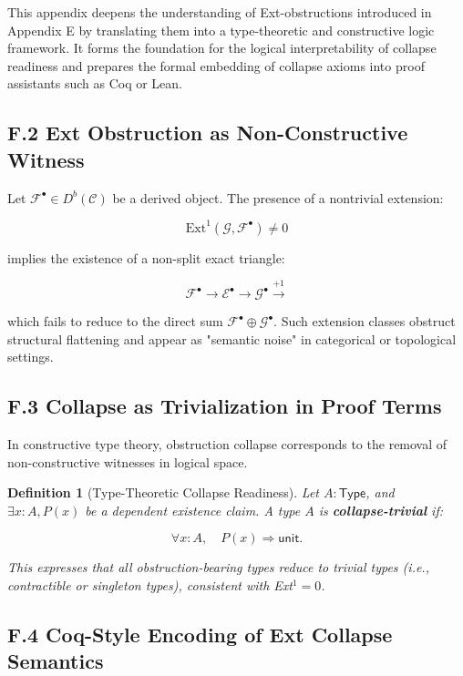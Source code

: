 \documentclass[11pt]{article}
\newtheorem{definition}[theorem]{Definition}
\begin{document}
This appendix deepens the understanding of Ext-obstructions introduced in Appendix E  
by translating them into a type-theoretic and constructive logic framework.  
It forms the foundation for the logical interpretability of collapse readiness  
and prepares the formal embedding of collapse axioms into proof assistants  
such as Coq or Lean.

\subsection*{F.2 Ext Obstruction as Non-Constructive Witness}

Let \( \mathcal{F}^\bullet \in D^b(\mathcal{C}) \) be a derived object.  
The presence of a nontrivial extension:

\[
\mathrm{Ext}^1(\mathcal{G}, \mathcal{F}^\bullet) \neq 0
\]

implies the existence of a non-split exact triangle:

\[
\mathcal{F}^\bullet \longrightarrow \mathcal{E}^\bullet \longrightarrow \mathcal{G}^\bullet \overset{+1}{\longrightarrow}
\]

which fails to reduce to the direct sum \( \mathcal{F}^\bullet \oplus \mathcal{G}^\bullet \).  
Such extension classes obstruct structural flattening and appear as "semantic noise"  
in categorical or topological settings.

\subsection*{F.3 Collapse as Trivialization in Proof Terms}

In constructive type theory, obstruction collapse corresponds to the removal  
of non-constructive witnesses in logical space.

\begin{definition}[Type-Theoretic Collapse Readiness]
Let \( A : \mathsf{Type} \), and \( \exists x : A, P(x) \) be a dependent existence claim.  
A type \( A \) is \textbf{collapse-trivial} if:

\[
\forall x : A, \quad P(x) \Rightarrow \mathsf{unit}.
\]

This expresses that all obstruction-bearing types reduce to trivial types  
(i.e., contractible or singleton types), consistent with Ext$^1 = 0$.
\end{definition}

\subsection*{F.4 Coq-Style Encoding of Ext Collapse Semantics}
\end{document}
